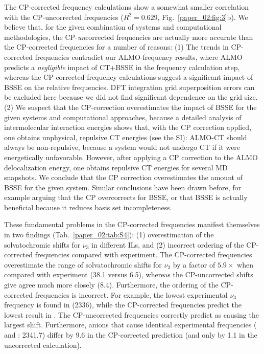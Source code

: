 The CP-corrected frequency calculations show a somewhat smaller correlation with the CP-uncorrected frequencies (\(R^2 = 0.629\), Fig.~\ref{paper_02:fig:3}b). We believe that, for the given combination of systems and computational methodologies, the CP-\emph{un}corrected frequencies are actually more accurate than the CP-corrected frequencies for a number of reasons: (1) The trends in CP-corrected frequencies contradict our ALMO-frequency results, where ALMO predicts a \emph{negligible} impact of CT+BSSE in the frequency calculation step, whereas the CP-corrected frequency calculations suggest a significant impact of BSSE on the relative frequencies. DFT integration grid superposition errors can be excluded here because we did not find significant dependence on the grid size. (2) We suspect that the CP-correction overestimates the impact of BSSE for the given systems and computational approaches, because a detailed analysis of intermolecular interaction energies shows that, with the CP correction applied, one obtains unphysical, repulsive CT energies (see the SI): ALMO-CT should always be non-repulsive, because a system would not undergo CT if it were energetically unfavorable. However, after applying a CP correction to the ALMO delocalization energy, one obtains repulsive CT energies for several MD snapshots. We conclude that the CP correction overestimates the amount of BSSE for the given system. Similar conclusions have been drawn before, for example arguing\cite{Collins1986} that the CP overcorrects for BSSE, or that BSSE is actually beneficial because it reduces basis set incompleteness.\cite{Mentel2014}

These fundamental problems in the CP-corrected frequencies manifest themselves in two findings (Tab.~\ref{paper_02:tab:S4}): (1) overestimation of the solvatochromic shifts for \(\nu_{3}\) in different ILs, and (2) incorrect ordering of the CP-corrected frequencies compared with experiment. The CP-corrected frequencies overestimate the range of solvatochromic shifts for \(\nu_{3}\) by a factor of \(5.9 \times\) when compared with experiment (\SI{38.1}{\wavenumber} versus \SI{6.5}{\wavenumber}), whereas the CP-uncorrected shifts give agree much more closely (\SI{8.4}{\wavenumber}). Furthermore, the ordering of the CP-corrected frequencies is incorrect. For example, the lowest experimental \(\nu_{3}\) frequency is found in \ce{[C4C1im][SCN]} (\SI{2336}{\wavenumber}), while the CP-corrected frequencies predict the lowest result in \ce{[C4C1im][DCA]}. The CP-uncorrected frequencies correctly predict \ce{[SCN]-} as causing the largest shift. Furthermore, anions that cause identical experimental frequencies (\ce{[Tf2N]-} and \ce{[BF4]-}: \SI{2341.7}{\wavenumber}) differ by \SI{9.6}{\wavenumber} in the CP-corrected prediction (and only by \SI{1.1}{\wavenumber} in the uncorrected calculation).

